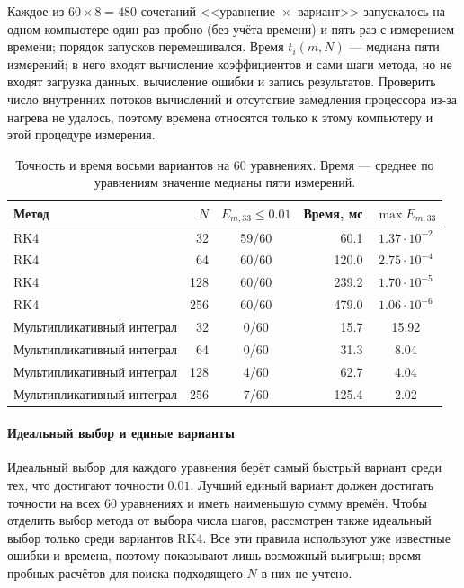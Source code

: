 \documentclass[14pt,a4paper]{extarticle}
\begin{document}
Каждое из $60\times8=480$ сочетаний <<уравнение~$\times$~вариант>>
запускалось на одном компьютере один раз пробно (без учёта времени)
и пять раз с измерением времени; порядок запусков перемешивался.
Время $t_i(m,N)$ --- медиана пяти измерений; в него входят вычисление
коэффициентов и сами шаги метода, но не входят загрузка данных,
вычисление ошибки и запись результатов. Проверить число внутренних
потоков вычислений и отсутствие замедления процессора из-за нагрева
не удалось, поэтому времена относятся только к этому компьютеру
и этой процедуре измерения.

\begin{table}[!htbp]
\centering
\caption{Точность и время восьми вариантов на 60 уравнениях. Время ---
среднее по уравнениям значение медианы пяти измерений.}
\label{tab:costpilot-configurations}
\small
\begin{tabular}{lrcrc}
\toprule
Метод & $N$ & $E_{m,33}\le0.01$ & Время, мс & $\max E_{m,33}$\\
\midrule
RK4 & 32  & 59/60 & 60.1  & $1.37\cdot10^{-2}$\\
RK4 & 64  & 60/60 & 120.0 & $2.75\cdot10^{-4}$\\
RK4 & 128 & 60/60 & 239.2 & $1.70\cdot10^{-5}$\\
RK4 & 256 & 60/60 & 479.0 & $1.06\cdot10^{-6}$\\
Мультипликативный интеграл & 32  & 0/60 & 15.7  & 15.92\\
Мультипликативный интеграл & 64  & 0/60 & 31.3  & 8.04\\
Мультипликативный интеграл & 128 & 4/60 & 62.7  & 4.04\\
Мультипликативный интеграл & 256 & 7/60 & 125.4 & 2.02\\
\bottomrule
\end{tabular}
\end{table}

\paragraph{Идеальный выбор и единые варианты\\}
Идеальный выбор для каждого уравнения берёт самый быстрый вариант среди
тех, что достигают точности $0.01$. Лучший единый вариант должен
достигать точности на всех 60 уравнениях и иметь наименьшую сумму
времён. Чтобы отделить выбор метода от выбора числа шагов, рассмотрен
также идеальный выбор только среди вариантов RK4. Все эти правила
используют уже известные ошибки и времена, поэтому показывают лишь
возможный выигрыш; время пробных расчётов для поиска подходящего $N$
в них не учтено.
\end{document}
